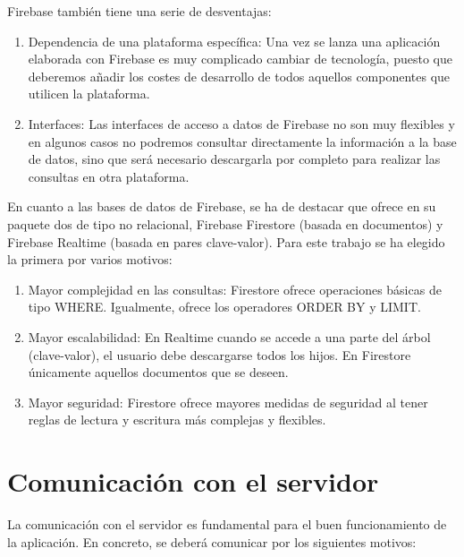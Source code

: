\documentclass[twoside]{report}
\begin{document}
Firebase también tiene una serie de desventajas:

\begin{enumerate}
\item Dependencia de una plataforma específica: Una vez se lanza una aplicación elaborada con Firebase es muy complicado cambiar de tecnología, puesto que deberemos añadir los costes de desarrollo de todos aquellos componentes que utilicen la plataforma.

\item Interfaces: Las interfaces de acceso a datos de Firebase no son muy flexibles y en algunos casos no podremos consultar directamente la información a la base de datos, sino que será necesario descargarla por completo para realizar las consultas en otra plataforma.

\end{enumerate}

En cuanto a las bases de datos de Firebase, se ha de destacar que ofrece en su paquete dos de tipo no relacional, Firebase Firestore (basada en documentos) y Firebase Realtime (basada en pares clave-valor). Para este trabajo se ha elegido la primera por varios motivos:

\begin{enumerate}
\item Mayor complejidad en las consultas: Firestore ofrece operaciones básicas de tipo WHERE. Igualmente, ofrece los operadores ORDER BY y LIMIT.
\item Mayor escalabilidad: En Realtime cuando se accede a una parte del árbol (clave-valor), el usuario debe descargarse todos los hijos. En Firestore únicamente aquellos documentos que se deseen.
\item Mayor seguridad: Firestore ofrece mayores medidas de seguridad al tener reglas de lectura y escritura más complejas y flexibles.
\end{enumerate}

\section{Comunicación con el servidor}
La comunicación con el servidor es fundamental para el buen funcionamiento de la aplicación. En concreto, se deberá comunicar por los siguientes motivos:
\end{document}
